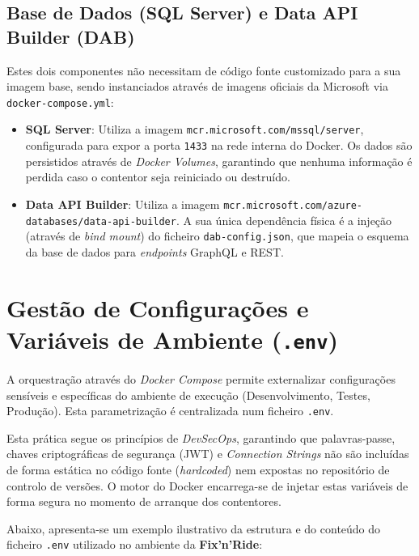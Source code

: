 \documentclass[a4paper,12pt]{scrreprt}
\begin{document}
\subsection{Base de Dados (SQL Server) e Data API Builder (DAB)}
Estes dois componentes não necessitam de código fonte customizado para a sua imagem base, sendo instanciados através de imagens oficiais da Microsoft via \texttt{docker-compose.yml}:
\begin{itemize}
    \item \textbf{SQL Server}: Utiliza a imagem \texttt{mcr.microsoft.com/mssql/server}, configurada para expor a porta \texttt{1433} na rede interna do Docker. Os dados são persistidos através de \textit{Docker Volumes}, garantindo que nenhuma informação é perdida caso o contentor seja reiniciado ou destruído.
    \item \textbf{Data API Builder}: Utiliza a imagem \texttt{mcr.microsoft.com/azure-databases/data-api-builder}. A sua única dependência física é a injeção (através de \textit{bind mount}) do ficheiro \texttt{dab-config.json}, que mapeia o esquema da base de dados para \textit{endpoints} GraphQL e REST.
\end{itemize}

\section{Gestão de Configurações e Variáveis de Ambiente (\texttt{.env})}

A orquestração através do \textit{Docker Compose} permite externalizar configurações sensíveis e específicas do ambiente de execução (Desenvolvimento, Testes, Produção). Esta parametrização é centralizada num ficheiro \texttt{.env}.

Esta prática segue os princípios de \textit{DevSecOps}, garantindo que palavras-passe, chaves criptográficas de segurança (JWT) e \textit{Connection Strings} não são incluídas de forma estática no código fonte (\textit{hardcoded}) nem expostas no repositório de controlo de versões. O motor do Docker encarrega-se de injetar estas variáveis de forma segura no momento de arranque dos contentores.

Abaixo, apresenta-se um exemplo ilustrativo da estrutura e do conteúdo do ficheiro \texttt{.env} utilizado no ambiente da \textbf{Fix'n'Ride}:
\end{document}
